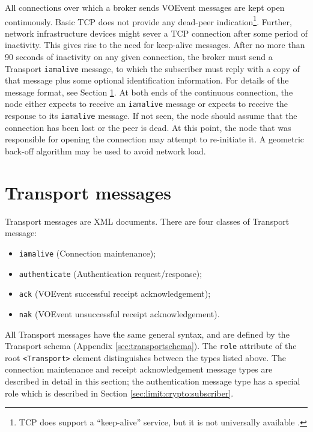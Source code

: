 \documentclass[a4paper,11pt]{ivoa}
\begin{document}
All connections over which a broker sends VOEvent messages are kept open
continuously. Basic TCP does not provide any dead-peer indication\footnote{
TCP does support a ``keep-alive'' service, but it is not universally available
\citep{Braden:1989}.}. Further, network infrastructure devices might sever a
TCP connection after some period of inactivity. This gives rise to the need
for keep-alive messages. After no more than 90 seconds of inactivity on any
given connection, the broker must send a Transport \texttt{iamalive} message,
to which the subscriber must reply with a copy of that message plus some
optional identification information. For details of the message format, see
Section \ref{sec:transport}.  At both ends of the continuous connection, the
node either expects to receive an \texttt{iamalive} message or expects to
receive the response to its \texttt{iamalive} message. If not seen, the node
should assume that the connection has been lost or the peer is dead. At this
point, the node that was responsible for opening the connection may attempt to
re-initiate it. A geometric back-off algorithm may be used to avoid network
load.

\section{Transport messages}
\label{sec:transport}

Transport messages are XML documents. There are four classes of Transport
message:

\begin{itemize}
\item{\texttt{iamalive} (Connection maintenance);}
\item{\texttt{authenticate} (Authentication request/response);}
\item{\texttt{ack} (VOEvent successful receipt acknowledgement);}
\item{\texttt{nak} (VOEvent unsuccessful receipt acknowledgement).}
\end{itemize}

All Transport messages have the same general syntax, and are defined by the
Transport schema (Appendix \ref{sec:transportschema}). The \texttt{role}
attribute of the root \texttt{<Transport>} element distinguishes between the
types listed above. The connection maintenance and receipt acknowledgement
message types are described in detail in this section; the authentication
message type has a special role which is described in Section
\ref{sec:limit:crypto:subscriber}.
\end{document}
